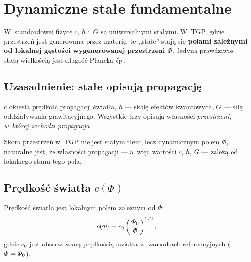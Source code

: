 \section{Dynamiczne sta\l{}e fundamentalne}\label{sec:stale}

W~standardowej fizyce $c$, $\hbar$ i~$G$ s\k{a} uniwersalnymi sta\l{}ymi.
W~TGP, gdzie przestrze\'n jest generowana przez materi\k{e}, te
,,sta\l{}e'' staj\k{a} si\k{e} \textbf{polami zale\.znymi od lokalnej
g\k{e}sto\'sci wygenerowanej przestrzeni $\Phi$}. Jedyn\k{a} prawdziwie
sta\l{}\k{a} wielko\'sci\k{a} jest d\l{}ugo\'s\'c Plancka $\ell_{\mathrm{P}}$.

\subsection{Uzasadnienie: sta\l{}e opisuj\k{a} propagacj\k{e}}\label{ssec:uzasadnienie}

$c$ okre\'sla pr\k{e}dko\'s\'c propagacji \'swiat\l{}a,
$\hbar$ --- skal\k{e} efekt\'ow kwantowych,
$G$ --- si\l{}\k{e} oddzia\l{}ywania grawitacyjnego.
Wszystkie trzy opisuj\k{a} w\l{}asno\'sci
\emph{przestrzeni, w~kt\'orej zachodzi propagacja}.

Skoro przestrze\'n w~TGP nie jest sta\l{}ym t\l{}em, lecz dynamicznym
polem $\Phi$, naturalne jest, \.ze w\l{}asno\'sci propagacji
--- a~wi\k{e}c warto\'sci $c$, $\hbar$, $G$ --- zale\.z\k{a} od
lokalnego stanu tego pola.

\subsection{Pr\k{e}dko\'s\'c \'swiat\l{}a $c(\Phi)$}\label{ssec:c}

\begin{axiom}\label{ax:c}
Pr\k{e}dko\'s\'c \'swiat\l{}a jest lokalnym polem zale\.znym od $\Phi$:
\begin{equation}\label{eq:cPhi}
    c(\varPhi) = c_0 \left(\frac{\varPhi_0}{\varPhi}\right)^{1/2},
\end{equation}
gdzie $c_0$ jest obserwowaną pr\k{e}dko\'sci\k{a} \'swiat\l{}a w~warunkach
referencyjnych ($\varPhi = \varPhi_0$).
\end{axiom}

